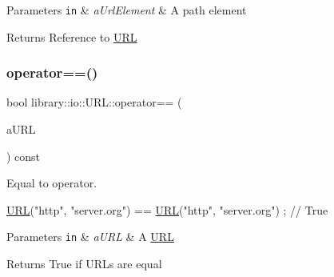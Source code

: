 \begin{DoxyParams}[1]{Parameters}
\mbox{\tt in}  & {\em a\+Url\+Element} & A path element \\
\hline
\end{DoxyParams}
\begin{DoxyReturn}{Returns}
Reference to \hyperlink{classlibrary_1_1io_1_1_u_r_l}{U\+RL} 
\end{DoxyReturn}
\mbox{\label{classlibrary_1_1io_1_1_u_r_l_a4a3011126a94a48d022edda036560be1}} 
\subsubsection{\texorpdfstring{operator==()}{operator==()}}
{\footnotesize\ttfamily bool library\+::io\+::\+U\+R\+L\+::operator== (\begin{DoxyParamCaption}\item[{const \hyperlink{classlibrary_1_1io_1_1_u_r_l}{U\+RL} \&}]{a\+U\+RL }\end{DoxyParamCaption}) const}



Equal to operator. 


\begin{DoxyCode}
\hyperlink{classlibrary_1_1io_1_1_u_r_l_a7e9c070138a6dbd000ffb10b7cd8a5c4}{URL}(\textcolor{stringliteral}{"http"}, \textcolor{stringliteral}{"server.org"}) == \hyperlink{classlibrary_1_1io_1_1_u_r_l_a7e9c070138a6dbd000ffb10b7cd8a5c4}{URL}(\textcolor{stringliteral}{"http"}, \textcolor{stringliteral}{"server.org"}) ; \textcolor{comment}{// True}
\end{DoxyCode}



\begin{DoxyParams}[1]{Parameters}
\mbox{\tt in}  & {\em a\+U\+RL} & A \hyperlink{classlibrary_1_1io_1_1_u_r_l}{U\+RL} \\
\hline
\end{DoxyParams}
\begin{DoxyReturn}{Returns}
True if U\+R\+Ls are equal 
\end{DoxyReturn}
\mbox{\label{classlibrary_1_1io_1_1_u_r_l_a03a589af0787df20428d4d33e26bb2d7}} 

